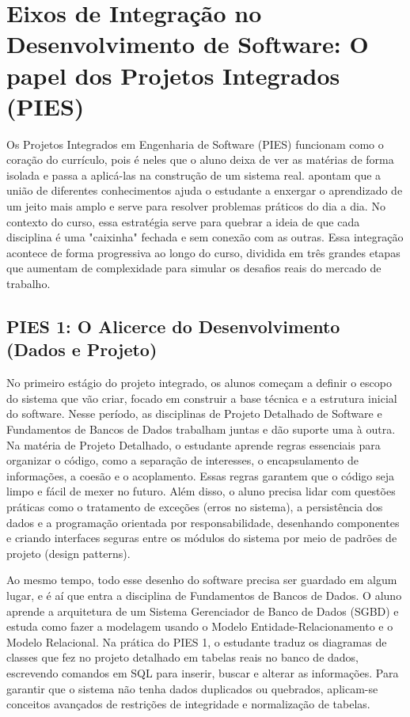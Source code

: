 \section{Eixos de Integração no Desenvolvimento de Software: O papel dos Projetos Integrados (PIES)}\label{sec:eixos-de-integracao}

Os Projetos Integrados em Engenharia de Software (PIES) funcionam como o
coração do currículo, pois é neles que o aluno deixa de ver as matérias de
forma isolada e passa a aplicá-las na construção de um sistema real.
 apontam que a união de diferentes
conhecimentos ajuda o estudante a enxergar o aprendizado de um jeito mais amplo
e serve para resolver problemas práticos do dia a dia. No contexto do curso,
essa estratégia serve para quebrar a ideia de que cada disciplina é uma
"caixinha" fechada e sem conexão com as outras. Essa integração acontece de
forma progressiva ao longo do curso, dividida em três grandes etapas que
aumentam de complexidade para simular os desafios reais do mercado de trabalho.

\subsection{ PIES 1: O Alicerce do Desenvolvimento (Dados e Projeto)} \label{sec:pies-1}

No primeiro estágio do projeto integrado, os alunos começam a definir o escopo
do sistema que vão criar, focado em construir a base técnica e a estrutura
inicial do software. Nesse período, as disciplinas de Projeto Detalhado de
Software e Fundamentos de Bancos de Dados trabalham juntas e dão suporte uma à
outra. Na matéria de Projeto Detalhado, o estudante aprende regras essenciais
para organizar o código, como a separação de interesses, o encapsulamento de
informações, a coesão e o acoplamento. Essas regras garantem que o código seja
limpo e fácil de mexer no futuro. Além disso, o aluno precisa lidar com
questões práticas como o tratamento de exceções (erros no sistema), a
persistência dos dados e a programação orientada por responsabilidade,
desenhando componentes e criando interfaces seguras entre os módulos do sistema
por meio de padrões de projeto (design patterns).

Ao mesmo tempo, todo esse desenho do software precisa ser guardado em algum
lugar, e é aí que entra a disciplina de Fundamentos de Bancos de Dados. O aluno
aprende a arquitetura de um Sistema Gerenciador de Banco de Dados (SGBD) e
estuda como fazer a modelagem usando o Modelo Entidade-Relacionamento e o
Modelo Relacional. Na prática do PIES 1, o estudante traduz os diagramas de
classes que fez no projeto detalhado em tabelas reais no banco de dados,
escrevendo comandos em SQL para inserir, buscar e alterar as informações. Para
garantir que o sistema não tenha dados duplicados ou quebrados, aplicam-se
conceitos avançados de restrições de integridade e normalização de tabelas.

